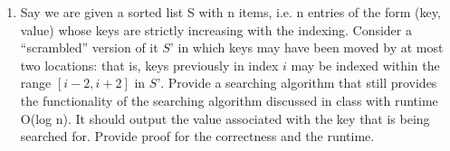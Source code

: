\documentclass{common/cs157}
\begin{document}
\newpage

\begin{problem}{3}
\begin{enumerate}
    \item Say we are given a sorted list S with n items, i.e. n entries of the form (key, value) whose keys are strictly increasing with the indexing. Consider a “scrambled” version of it $S’$ in which keys may have been moved by at most two locations: that is, keys previously in index $i$ may be indexed within the range $[i-2, i+2]$ in $S’$. Provide a searching algorithm that still provides the functionality of the searching algorithm discussed in class with runtime O(log n). It should output the value associated with the key that is being searched for. Provide proof for the correctness and the runtime.
\end{enumerate}
\end{problem}
\end{document}
